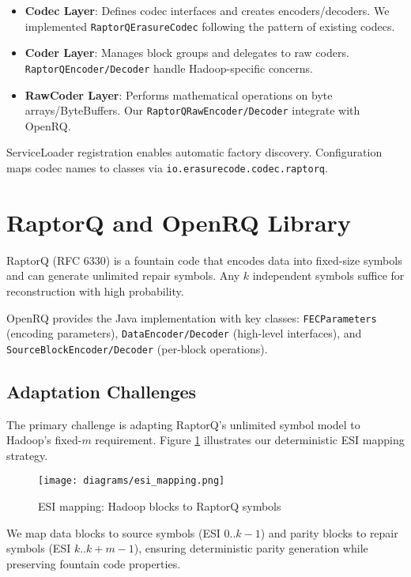 \documentclass{article}
\begin{document}
\begin{itemize}
\item \textbf{Codec Layer}: Defines codec interfaces and creates encoders/decoders. We implemented \texttt{RaptorQErasureCodec} following the pattern of existing codecs.
\item \textbf{Coder Layer}: Manages block groups and delegates to raw coders. \texttt{RaptorQEncoder/Decoder} handle Hadoop-specific concerns.
\item \textbf{RawCoder Layer}: Performs mathematical operations on byte arrays/ByteBuffers. Our \texttt{RaptorQRawEncoder/Decoder} integrate with OpenRQ.
\end{itemize}

ServiceLoader registration enables automatic factory discovery. Configuration maps codec names to classes via \texttt{io.erasurecode.codec.raptorq}.

\section{RaptorQ and OpenRQ Library}

RaptorQ (RFC 6330) is a fountain code that encodes data into fixed-size symbols and can generate unlimited repair symbols. Any $k$ independent symbols suffice for reconstruction with high probability.

OpenRQ provides the Java implementation with key classes: \texttt{FECParameters} (encoding parameters), \texttt{DataEncoder/Decoder} (high-level interfaces), and \texttt{SourceBlockEncoder/Decoder} (per-block operations).

\subsection{Adaptation Challenges}

The primary challenge is adapting RaptorQ's unlimited symbol model to Hadoop's fixed-$m$ requirement. Figure \ref{fig:esi-mapping} illustrates our deterministic ESI mapping strategy.

\begin{figure}[h]
\centering
\texttt{[image: diagrams/esi\_mapping.png]}
\caption{\label{fig:esi-mapping}ESI mapping: Hadoop blocks to RaptorQ symbols}
\end{figure}

We map data blocks to source symbols (ESI $0..k-1$) and parity blocks to repair symbols (ESI $k..k+m-1$), ensuring deterministic parity generation while preserving fountain code properties.
\end{document}

